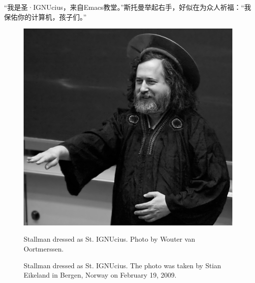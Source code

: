\ifdefined\chs
``我是圣·IGNUcius，来自Emacs教堂。''斯托曼举起右手，好似在为众人祈福：``我保佑你的计算机，孩子们。''
\fi

\ifdefined\eng
\begin{figure}[ht] \centering
  \includegraphics{stignucius}
  \ifdefined\vone
  \caption{Stallman dressed as St. IGNUcius. Photo by Wouter van Oortmerssen.}
  \fi
  \ifdefined\vtwo
  \caption{Stallman dressed as St. IGNUcius. The photo was taken by Stian Eikeland in Bergen, Norway on February 19, 2009.}
  \fi
\end{figure}
\fi

